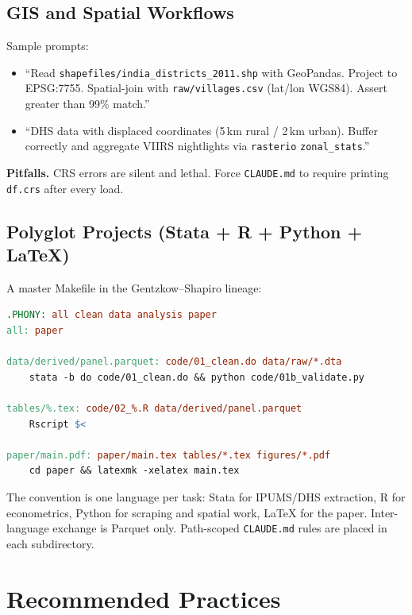 \documentclass[11pt]{article}
\begin{document}
\subsection{GIS and Spatial Workflows}

Sample prompts:
\begin{itemize}[leftmargin=*,nosep]
    \item ``Read \texttt{shapefiles/india\_districts\_2011.shp} with GeoPandas. Project to EPSG:7755. Spatial-join with \texttt{raw/villages.csv} (lat/lon WGS84). Assert greater than 99\% match.''
    \item ``DHS data with displaced coordinates (5\,km rural / 2\,km urban). Buffer correctly and aggregate VIIRS nightlights via \texttt{rasterio} \texttt{zonal\_stats}.''
\end{itemize}

\textbf{Pitfalls.} CRS errors are silent and lethal. Force \texttt{CLAUDE.md} to require printing \texttt{df.crs} after every load. 

\subsection{Polyglot Projects (Stata + R + Python + \LaTeX)}

A master Makefile in the Gentzkow--Shapiro lineage:

\begin{lstlisting}[language=make]
.PHONY: all clean data analysis paper
all: paper

data/derived/panel.parquet: code/01_clean.do data/raw/*.dta
	stata -b do code/01_clean.do && python code/01b_validate.py

tables/%.tex: code/02_%.R data/derived/panel.parquet
	Rscript $<

paper/main.pdf: paper/main.tex tables/*.tex figures/*.pdf
	cd paper && latexmk -xelatex main.tex
\end{lstlisting}

The convention is one language per task: Stata for IPUMS/DHS extraction, R for econometrics, Python for scraping and spatial work, \LaTeX{} for the paper. Inter-language exchange is Parquet only. Path-scoped \texttt{CLAUDE.md} rules are placed in each subdirectory.

\section{Recommended Practices}\label{sec:practices}
\end{document}
